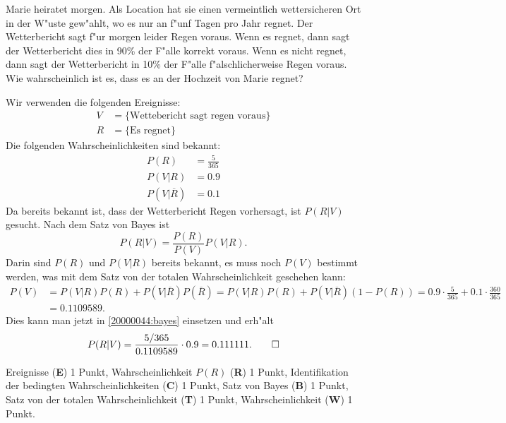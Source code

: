 Marie heiratet morgen.
Als Location hat sie einen vermeintlich wettersicheren Ort in 
der W"uste gew"ahlt, wo es nur an f"unf Tagen pro Jahr regnet.
Der Wetterbericht sagt f"ur morgen leider Regen voraus.
Wenn es regnet, dann sagt der Wetterbericht dies in 90\% der F"alle
korrekt voraus.
Wenn es nicht regnet, dann sagt der Wetterbericht in 10\% der F"alle
f"alschlicherweise Regen voraus.
Wie wahrscheinlich ist es, dass es an der Hochzeit von Marie regnet?


\begin{loesung}
Wir verwenden die folgenden Ereignisse:
\begin{align*}
V&=\{\text{Wettebericht sagt regen voraus}\}\\
R&=\{\text{Es regnet}\}
\end{align*}
Die folgenden Wahrscheinlichkeiten sind bekannt:
\begin{align*}
P(R)
&=
\frac{5}{365}
\\
P(V|R)
&=
0.9
\\
P(V|\overline{R})
&=
0.1
\end{align*}
Da bereits bekannt ist, dass der Wetterbericht Regen vorhersagt, ist
$P(R|V)$ gesucht.
Nach dem Satz von Bayes ist
\begin{equation}
P(R|V)
=
\frac{P(R)}{P(V)}P(V|R).
\label{20000044:bayes} 
\end{equation}
Darin sind $P(R)$ und $P(V|R)$ bereits bekannt, es muss noch $P(V)$ bestimmt
werden, was mit dem Satz von der totalen Wahrscheinlichkeit geschehen kann:
\begin{align*}
P(V)
&=
P(V|R)P(R)+P(V|\overline{R})P(\overline{R})
=
P(V|R)P(R)+P(V|\overline{R})(1-P(R))
=
0.9\cdot\frac{5}{365}+0.1\cdot\frac{360}{365}
\\
&=
0.1109589.
\end{align*}
Dies kann man jetzt in \eqref{20000044:bayes} einsetzen und erh"alt
\[
P(R|V)
=
\frac{5/365}{0.1109589}\cdot 0.9
=
0.111111.
\qedhere
\]
\end{loesung}

\begin{bewertung}
Ereignisse ({\bf E}) 1 Punkt,
Wahrscheinlichkeit $P(R)$ ({\bf R}) 1 Punkt,
Identifikation der bedingten Wahrscheinlichkeiten ({\bf C}) 1 Punkt,
Satz von Bayes ({\bf B}) 1 Punkt,
Satz von der totalen Wahrscheinlichkeit ({\bf T}) 1 Punkt,
Wahrscheinlichkeit ({\bf W}) 1 Punkt.
\end{bewertung}

